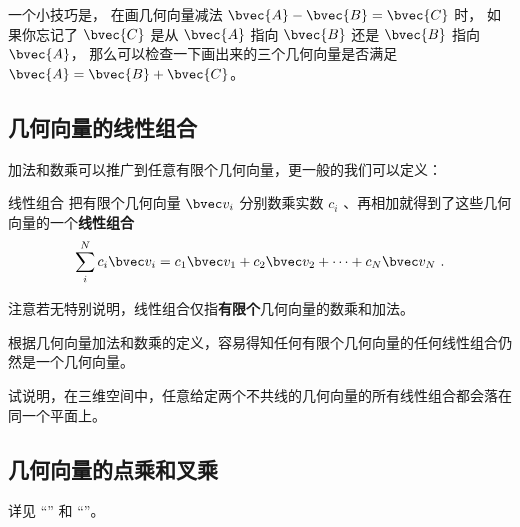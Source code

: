 一个小技巧是， 在画几何向量减法 $\bvec{A} - \bvec{B} = \bvec{C}$ 时， 如果你忘记了 $\bvec{C}$ 是从 $\bvec{A}$ 指向 $\bvec{B}$ 还是 $\bvec{B}$ 指向 $\bvec{A}$， 那么可以检查一下画出来的三个几何向量是否满足 $\bvec{A} = \bvec{B} + \bvec{C}$。


\subsection{几何向量的线性组合}

加法和数乘可以推广到任意有限个几何向量，更一般的我们可以定义：
\begin{definition}{线性组合}
把有限个几何向量 $\bvec v_i$ 分别数乘实数 $c_i$ 、再相加就得到了这些几何向量的一个\textbf{线性组合}
\begin{equation}\label{eq_GVecOp_1}
\sum_i^N c_i \bvec v_i = c_1\bvec v_1 + c_2\bvec v_2 +\dots +c_N \bvec v_N~.
\end{equation}
\end{definition}
注意若无特别说明，线性组合仅指\textbf{有限个}几何向量的数乘和加法。


根据几何向量加法和数乘的定义，容易得知任何有限个几何向量的任何线性组合仍然是一个几何向量。

\begin{exercise}{}
试说明，在三维空间中，任意给定两个不共线的几何向量的所有线性组合都会落在同一个平面上。
\end{exercise}

\subsection{几何向量的点乘和叉乘}
详见 “” 和 “”。
